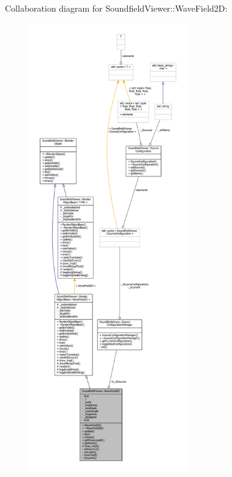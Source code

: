 Collaboration diagram for Soundfield\-Viewer\-:\-:Wave\-Field2\-D\-:
\nopagebreak
\begin{figure}[H]
\begin{center}
\leavevmode
\includegraphics[height=550pt]{d5/d63/classSoundfieldViewer_1_1WaveField2D__coll__graph}
\end{center}
\end{figure}
